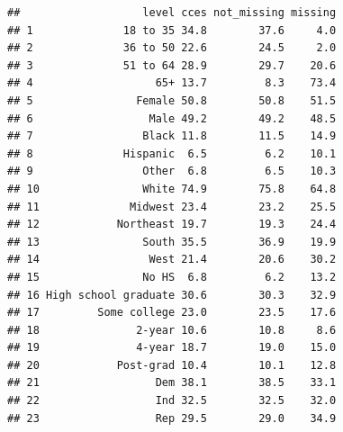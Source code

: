 \documentclass[]{article}
\begin{document}
\begin{verbatim}
##                   level cces not_missing missing
## 1              18 to 35 34.8        37.6     4.0
## 2              36 to 50 22.6        24.5     2.0
## 3              51 to 64 28.9        29.7    20.6
## 4                   65+ 13.7         8.3    73.4
## 5                Female 50.8        50.8    51.5
## 6                  Male 49.2        49.2    48.5
## 7                 Black 11.8        11.5    14.9
## 8              Hispanic  6.5         6.2    10.1
## 9                 Other  6.8         6.5    10.3
## 10                White 74.9        75.8    64.8
## 11              Midwest 23.4        23.2    25.5
## 12            Northeast 19.7        19.3    24.4
## 13                South 35.5        36.9    19.9
## 14                 West 21.4        20.6    30.2
## 15                No HS  6.8         6.2    13.2
## 16 High school graduate 30.6        30.3    32.9
## 17         Some college 23.0        23.5    17.6
## 18               2-year 10.6        10.8     8.6
## 19               4-year 18.7        19.0    15.0
## 20            Post-grad 10.4        10.1    12.8
## 21                  Dem 38.1        38.5    33.1
## 22                  Ind 32.5        32.5    32.0
## 23                  Rep 29.5        29.0    34.9
\end{verbatim}
\end{document}
